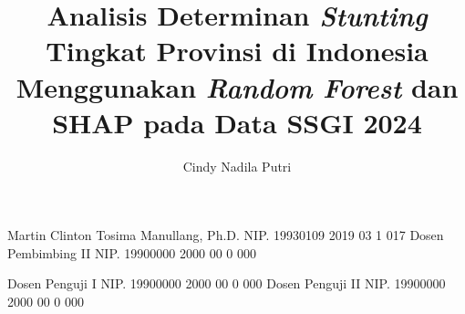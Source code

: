 \documentclass[article]{report} %
\begin{document}
    
    \title{Analisis Determinan \textit{Stunting} Tingkat Provinsi di Indonesia Menggunakan \textit{Random Forest} dan SHAP pada Data SSGI 2024}
    
	\author{Cindy Nadila Putri}		%
	
	\dosbingA%
		{Martin Clinton Tosima Manullang, Ph.D.}%
		{NIP. 19930109 2019 03 1 017}	%
	\dosbingB%
		{Dosen Pembimbing II}%
		{NIP. 19900000 2000 00 0 000}	%
		
	\pengujiA%
		{Dosen Penguji I}%
		{NIP. 19900000 2000 00 0 000}	%
	\pengujiB%
		{Dosen Penguji II}%
		{NIP. 19900000 2000 00 0 000}	%

	\sloppy %
    \setcounter{page}{1} %
\end{document}

